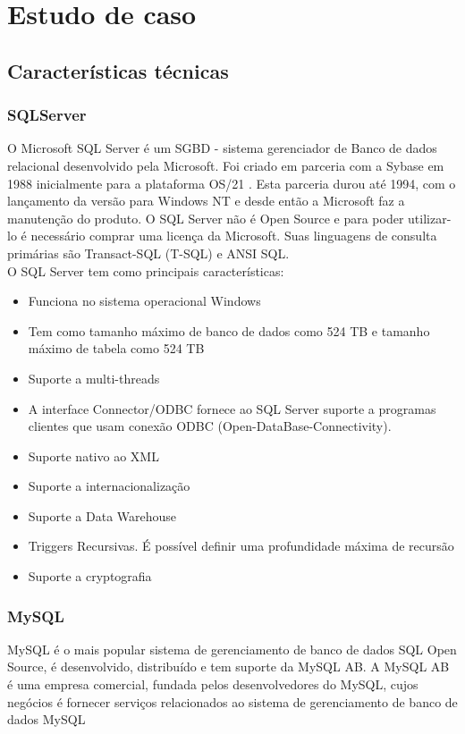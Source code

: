 \documentclass[conference]{IEEEtran}
\begin{document}
\section{Estudo de caso}
  \subsection{Características técnicas}
    \subsubsection{SQLServer }
    O Microsoft SQL Server é um SGBD - sistema gerenciador de Banco de dados relacional desenvolvido pela Microsoft. Foi criado em parceria com a Sybase em 1988 inicialmente para a plataforma OS/21 . Esta parceria durou até 1994, com o lançamento da versão para Windows NT e desde então a Microsoft faz a manutenção do produto. O SQL Server não é Open Source e para poder utilizar-lo é necessário comprar uma licença da Microsoft. Suas linguagens de consulta primárias são Transact-SQL (T-SQL) e ANSI SQL.\cite{sql-server-site}\\
    
    O SQL Server tem como principais características:
    \begin{itemize}
      \item Funciona no sistema operacional Windows
      \item Tem como tamanho máximo de banco de dados como 524 TB  e tamanho máximo de tabela como 524 TB
      \item Suporte a multi-threads
      \item A interface Connector/ODBC fornece ao SQL Server suporte a programas clientes que usam conexão ODBC (Open-DataBase-Connectivity).
      \item Suporte nativo ao XML
      \item Suporte a internacionalização
      \item Suporte a Data Warehouse
      \item Triggers Recursivas. É possível definir uma profundidade máxima de recursão
      \item Suporte a cryptografia
    \end{itemize}

    \subsubsection{MySQL}
	  MySQL é o mais popular sistema de gerenciamento de banco de dados SQL Open Source, é desenvolvido, distribuído e tem suporte da MySQL AB. A MySQL AB é uma empresa comercial, fundada pelos desenvolvedores do MySQL, cujos negócios é fornecer serviços relacionados ao sistema de gerenciamento de banco de dados MySQL\cite{mysql-site}\\
\end{document}
